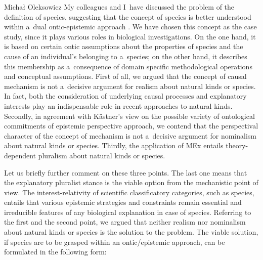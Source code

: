 \begin{artengenv}{Michał Oleksowicz}
My colleagues and I~have discussed the problem of the definition of species, suggesting that the concept of species is better understood within a~dual ontic-epistemic approach
\parencite[][]{marcacci_ontic_2023}. %
 We have chosen this concept as the case study, since it plays various roles in biological investigations. On the one hand, it is based on certain ontic assumptions about the properties of species and the cause of an individual's belonging to a~species; on the other hand, it describes this membership as a~consequence of domain specific methodological operations and conceptual assumptions. First of all, we argued that the concept of causal mechanism is not a~decisive argument for realism about natural kinds or species. In fact, both the consideration of underlying causal processes and explanatory interests play an indispensable role in recent approaches to natural kinds. Secondly, in agreement with Kästner's view on the possible variety of ontological commitments of epistemic perspective approach, we contend that the perspectival character of the concept of mechanism is not a~decisive argument for nominalism about natural kinds or species. Thirdly, the application of MEx entails theory-dependent pluralism about natural kinds or species.

Let us briefly further comment on these three points. The last one means that the explanatory pluralist stance is the viable option from the mechanistic point of view. The interest-relativity of scientific classificatory categories, such as species, entails that various epistemic strategies and constraints remain essential and irreducible features of any biological explanation in case of species. Referring to the first and the second point, we argued that neither realism nor nominalism about natural kinds or species is the solution to the problem. The viable solution, if species are to be grasped within an ontic/epistemic approach, can be formulated in the following form:


\end{artengenv}
